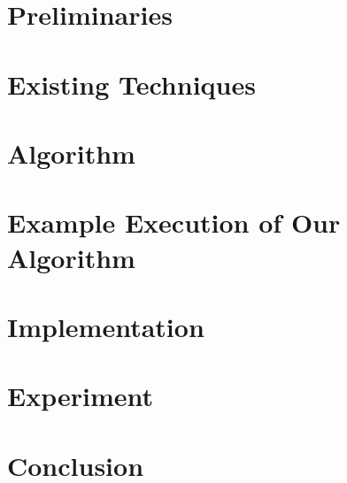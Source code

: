 \documentclass{llncs}
\newcommand{\todo}[1] {
  \textcolor{todocolor}{TODO: #1}
}
\begin{document}
%

\section{Preliminaries}
\label{sec:preliminaries}



\section{Existing Techniques}
\label{sec:existing-techniques}



\section{Algorithm}
\label{sec:algorithm}


\section{Example Execution of Our Algorithm}
\label{sec:example-execution}




\section{Implementation}
\label{sec:implementation}



\section{Experiment}
\label{sec:experiment}


\section{Conclusion}
\label{sec:conclusions}





\end{document}
